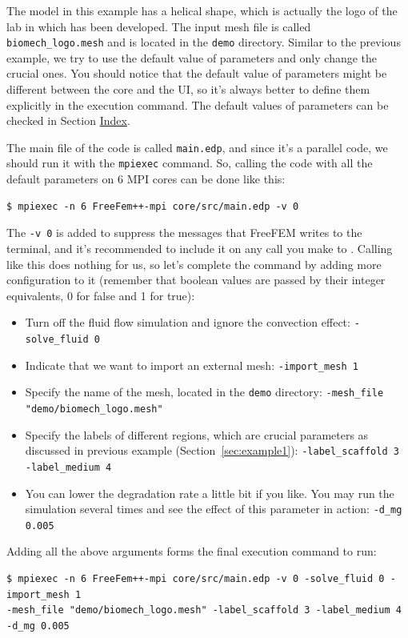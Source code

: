 The model in this example has a helical shape, which is actually the logo of the lab in which \biodeg{} has been developed. The input mesh file is called \verb|biomech_logo.mesh| and is located in the \verb|demo| directory. Similar to the previous example, we try to use the default value of parameters and only change the crucial ones. You should notice that the default value of parameters might be different between the core \biodeg{} and the UI, so it's always better to define them explicitly in the execution command. The default values of parameters can be checked in Section  \hyperref[sec:index]{Index}.

The main file of the \biodeg{} code is called \verb|main.edp|, and since it's a parallel code, we should run it with the \verb|mpiexec| command. So, calling the code with all the default parameters on 6 MPI cores can be done like this:
\begin{verbatim}
$ mpiexec -n 6 FreeFem++-mpi core/src/main.edp -v 0
\end{verbatim}

The \verb|-v 0| is added to suppress the messages that FreeFEM writes to the terminal, and it's recommended to include it on any call you make to \biodeg{}. Calling \biodeg{} like this does nothing for us, so let's complete the command by adding more configuration to it (remember that boolean values are passed by their integer equivalents, 0 for false and 1 for true):

\begin{itemize}
\item
Turn off the fluid flow simulation and ignore the convection effect: \verb|-solve_fluid 0|
\item
Indicate that we want to import an external mesh: \verb|-import_mesh 1|
\item
Specify the name of the mesh, located in the \verb|demo| directory: \verb|-mesh_file "demo/biomech_logo.mesh"|
\item 
Specify the labels of different regions, which are crucial parameters as discussed in previous example (Section~\ref{sec:example1}): \verb|-label_scaffold 3 -label_medium 4|
\item
You can lower the degradation rate a little bit if you like. You may run the simulation several times and see the effect of this parameter in action: \verb|-d_mg 0.005|
\end{itemize}

Adding all the above arguments forms the final execution command to run:
\begin{verbatim}
$ mpiexec -n 6 FreeFem++-mpi core/src/main.edp -v 0 -solve_fluid 0 -import_mesh 1 
-mesh_file "demo/biomech_logo.mesh" -label_scaffold 3 -label_medium 4 -d_mg 0.005
\end{verbatim}

